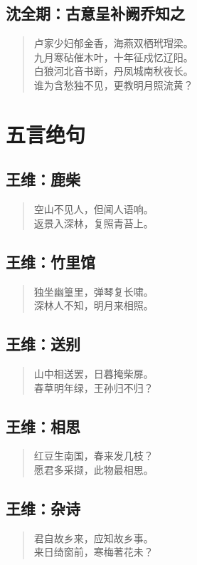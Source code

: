 \documentclass[12pt,oneside]{book}
\newenvironment{shici}{
\begin{verse}
\centering\large\hspace{12pt}}
{\end{verse}}
\begin{document}
\chapter{沈全期：古意呈补阙乔知之}
\begin{shici}
卢家少妇郁金香，海燕双栖玳瑁梁。\\
九月寒砧催木叶，十年征戍忆辽阳。\\
白狼河北音书断，丹凤城南秋夜长。\\
谁为含愁独不见，更教明月照流黄？
\end{shici}


\part{五言绝句}
\chapter{王维：鹿柴}
\begin{shici}
空山不见人，但闻人语响。\\
返景入深林，复照青苔上。
\end{shici}

\chapter{王维：竹里馆}
\begin{shici}
独坐幽篁里，弹琴复长啸。\\
深林人不知，明月来相照。
\end{shici}

\chapter{王维：送别}
\begin{shici}
山中相送罢，日暮掩柴扉。\\
春草明年绿，王孙归不归？
\end{shici}

\chapter{王维：相思}
\begin{shici}
红豆生南国，春来发几枝？\\
愿君多采撷，此物最相思。
\end{shici}

\chapter{王维：杂诗}
\begin{shici}
君自故乡来，应知故乡事。\\
来日绮窗前，寒梅著花未？
\end{shici}
\end{document}

